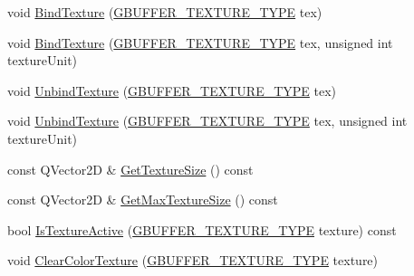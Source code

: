 \begin{DoxyCompactItemize}
\item 
void \mbox{\hyperlink{class_geometry_engine_1_1_geometry_buffer_1_1_g_buffer_a6a2469afe0c79b97d35ba5d2b6a1ae52}{Bind\+Texture}} (\mbox{\hyperlink{class_geometry_engine_1_1_geometry_buffer_1_1_g_buffer_a718dceafcac1915f7de061108597e1cc}{G\+B\+U\+F\+F\+E\+R\+\_\+\+T\+E\+X\+T\+U\+R\+E\+\_\+\+T\+Y\+PE}} tex)
\item 
void \mbox{\hyperlink{class_geometry_engine_1_1_geometry_buffer_1_1_g_buffer_a3142603e5ce9519da6d4aba1d07fec1f}{Bind\+Texture}} (\mbox{\hyperlink{class_geometry_engine_1_1_geometry_buffer_1_1_g_buffer_a718dceafcac1915f7de061108597e1cc}{G\+B\+U\+F\+F\+E\+R\+\_\+\+T\+E\+X\+T\+U\+R\+E\+\_\+\+T\+Y\+PE}} tex, unsigned int texture\+Unit)
\item 
void \mbox{\hyperlink{class_geometry_engine_1_1_geometry_buffer_1_1_g_buffer_a15ffb63e72295abb6a10b2481fb878e4}{Unbind\+Texture}} (\mbox{\hyperlink{class_geometry_engine_1_1_geometry_buffer_1_1_g_buffer_a718dceafcac1915f7de061108597e1cc}{G\+B\+U\+F\+F\+E\+R\+\_\+\+T\+E\+X\+T\+U\+R\+E\+\_\+\+T\+Y\+PE}} tex)
\item 
void \mbox{\hyperlink{class_geometry_engine_1_1_geometry_buffer_1_1_g_buffer_a0bbb50c4eabcee8677a3da316042c44e}{Unbind\+Texture}} (\mbox{\hyperlink{class_geometry_engine_1_1_geometry_buffer_1_1_g_buffer_a718dceafcac1915f7de061108597e1cc}{G\+B\+U\+F\+F\+E\+R\+\_\+\+T\+E\+X\+T\+U\+R\+E\+\_\+\+T\+Y\+PE}} tex, unsigned int texture\+Unit)
\item 
const Q\+Vector2D \& \mbox{\hyperlink{class_geometry_engine_1_1_geometry_buffer_1_1_g_buffer_a2b829115597fc587cd6f4ddb52b875cc}{Get\+Texture\+Size}} () const
\item 
const Q\+Vector2D \& \mbox{\hyperlink{class_geometry_engine_1_1_geometry_buffer_1_1_g_buffer_a47bda4849000d2728538de4e2f27f11a}{Get\+Max\+Texture\+Size}} () const
\item 
bool \mbox{\hyperlink{class_geometry_engine_1_1_geometry_buffer_1_1_g_buffer_a66ccde86e455532b2eac771163570f04}{Is\+Texture\+Active}} (\mbox{\hyperlink{class_geometry_engine_1_1_geometry_buffer_1_1_g_buffer_a718dceafcac1915f7de061108597e1cc}{G\+B\+U\+F\+F\+E\+R\+\_\+\+T\+E\+X\+T\+U\+R\+E\+\_\+\+T\+Y\+PE}} texture) const
\item 
void \mbox{\hyperlink{class_geometry_engine_1_1_geometry_buffer_1_1_g_buffer_abf39c85cb87eaf0475205b59333253c0}{Clear\+Color\+Texture}} (\mbox{\hyperlink{class_geometry_engine_1_1_geometry_buffer_1_1_g_buffer_a718dceafcac1915f7de061108597e1cc}{G\+B\+U\+F\+F\+E\+R\+\_\+\+T\+E\+X\+T\+U\+R\+E\+\_\+\+T\+Y\+PE}} texture)

\end{DoxyCompactItemize}
